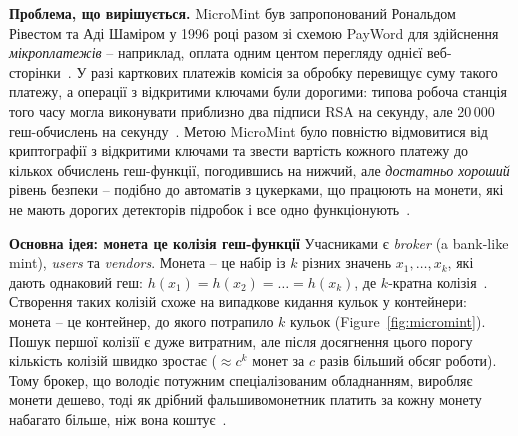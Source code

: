 \textbf{Проблема, що вирішується.} MicroMint був запропонований Рональдом Рівестом та Аді Шаміром у 1996 році 
разом зі схемою PayWord для здійснення \emph{мікроплатежів} -- наприклад, оплата одним центом перегляду однієї 
веб-сторінки~\cite{rivest1996micromint}. У разі карткових платежів комісія за обробку перевищує суму такого 
платежу, а операції з відкритими ключами були дорогими: типова робоча станція того часу могла виконувати 
приблизно два підписи RSA на секунду, але 20\,000 геш-обчислень на секунду~\cite{rivest1996micromint}. Метою 
MicroMint було повністю відмовитися від криптографії з відкритими ключами та звести вартість кожного платежу до 
кількох обчислень геш-функції, погодившись на нижчий, але \textit{достатньо хороший} рівень безпеки -- подібно 
до автоматів з цукерками, що працюють на монети, які не мають дорогих детекторів підробок і все одно функціонують~\cite{rivest1996micromint}.

\textbf{Основна ідея: монета це колізія геш-функції} Учасниками є \emph{broker} (a bank-like mint), \emph{users} 
та \emph{vendors}. Монета -- це набір із $k$ різних значень $x_1,\ldots,x_k$, які дають однаковий геш: 
$h(x_1) = h(x_2) = \ldots = h(x_k)$, де $k$-кратна колізія~\cite{rivest1996micromint}. Створення таких колізій 
схоже на випадкове кидання кульок у контейнери: монета -- це контейнер, до якого потрапило $k$ кульок (Figure~\ref{fig:micromint}). 
Пошук першої колізії є дуже витратним, але після досягнення цього порогу кількість колізій швидко зростає 
($\approx c^k$  монет за $c$ разів більший обсяг роботи). Тому брокер, що володіє потужним спеціалізованим обладнанням, 
виробляє монети дешево, тоді як дрібний фальшивомонетник платить за кожну монету набагато більше, ніж вона коштує~\cite{rivest1996micromint}.

